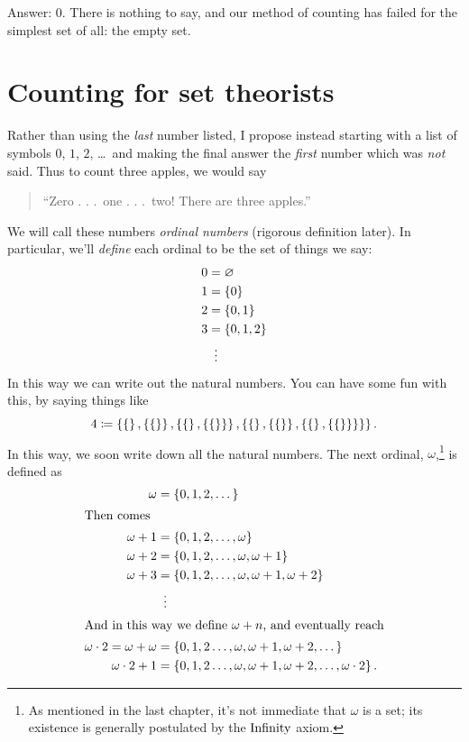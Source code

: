 Answer: $0$. There is nothing to say, and our method of counting has failed
for the simplest set of all: the empty set.

\section{Counting for set theorists}
Rather than using the \emph{last} number listed, I propose instead
starting with a list of symbols $0$, $1$, $2$, \dots\ and making
the final answer the \emph{first} number which was \emph{not} said.
Thus to count three apples, we would say 
\begin{quote}
	``Zero . . .\ one . . .\ two!  There are three apples.''
\end{quote}
We will call these numbers \emph{ordinal numbers} (rigorous definition later).
In particular, we'll \emph{define} each ordinal to be the set of things we say:
\begin{align*}
	0 &= \varnothing \\
	1 &= \{0\} \\
	2 &= \{0,1\} \\
	3 &= \{0,1,2\} \\
	&\vdotswithin=
\end{align*}
In this way we can write out the natural numbers.
You can have some fun with this, by saying things like
\[
	4 \coloneqq
	\left\{ 
		\left\{  \right\},
		\left\{ \left\{  \right\} \right\},
		\left\{ \left\{  \right\}, \left\{ \left\{  \right\} \right\} \right\},
		\left\{ 
			\left\{  \right\},
			\left\{ \left\{  \right\} \right\},
			\left\{ \left\{  \right\}, \left\{ \left\{  \right\} \right\} \right\}
		\right\}
	\right\}.
\]
In this way, we soon write down all the natural numbers.
The next ordinal, $\omega$,\footnote{As mentioned in the last chapter,
	it's not immediate that $\omega$ is a set;
	its existence is generally postulated by the $\mathrm{Infinity}$ axiom.
} is defined as
\begin{align*}
	\omega &= \left\{ 0, 1, 2, \dots \right\} \\
	\intertext{Then comes}
	\omega+1 &= \left\{ 0, 1, 2, \dots, \omega \right\} \\
	\omega+2 &= \left\{ 0, 1, 2, \dots, \omega, \omega+1 \right\} \\
	\omega+3 &= \left\{ 0, 1, 2, \dots, \omega, \omega+1, \omega+2 \right\} \\
	&\vdotswithin= \\
	\intertext{And in this way we define $\omega+n$, and eventually reach}
	\omega \cdot 2 = \omega+\omega &= \left\{ 0, 1, 2 \dots, \omega, \omega+1, \omega+2, \dots \right\} \\
	\omega \cdot 2 + 1 &= \left\{ 0, 1, 2 \dots, \omega, \omega+1, \omega+2, \dots, \omega \cdot 2 \right\}.
\end{align*}
